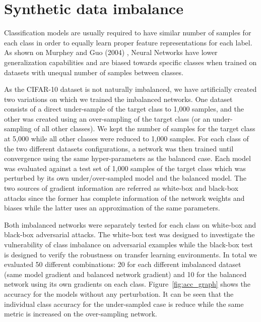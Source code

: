 \section{Synthetic data imbalance}

Classification models are usually required to have similar number of samples for each class in order to equally learn proper feature representations for each label. As shown on Murphey and Guo (2004) \cite{murphey2004}, Neural Networks have lower generalization capabilities and are biased towards specific classes when trained on datasets with unequal number of samples between classes. 

As the CIFAR-10 dataset is not naturally imbalanced, we have artificially created two variations on which we trained the imbalanced networks.  One dataset consists of a direct under-sample of the target class to 1,000 samples, and the other was created using  an over-sampling of the target class (or an under-sampling of all other classes). We kept the number of samples for the target class at 5,000 while all other classes were reduced to 1,000 samples. For each class of the two different datasets configurations, a network was then trained until convergence using the same hyper-parameters as the balanced case. Each model was evaluated against a test set of 1,000 samples of the target class which was perturbed by its own under/over-sampled model and the balanced model. The two sources of gradient information are referred as white-box and black-box attacks since the former has complete information of the network weights and biases while the latter uses an approximation of the same parameters. 

Both imbalanced networks were separately tested for each class on white-box and black-box adversarial attacks. The white-box test was designed to investigate the vulnerability of class imbalance on adversarial examples while the black-box test is designed to verify the robustness on transfer learning environments. In total we evaluated 50 different combinations: 20 for each different imbalanced dataset (same model gradient and balanced network gradient) and 10 for the balanced network using its own gradients on each class. Figure~\ref{fig:acc_graph} shows the accuracy for the models without any perturbation. It can be seen that the individual class accuracy for the under-sampled case is reduce while the same metric is increased on the over-sampling network. 

